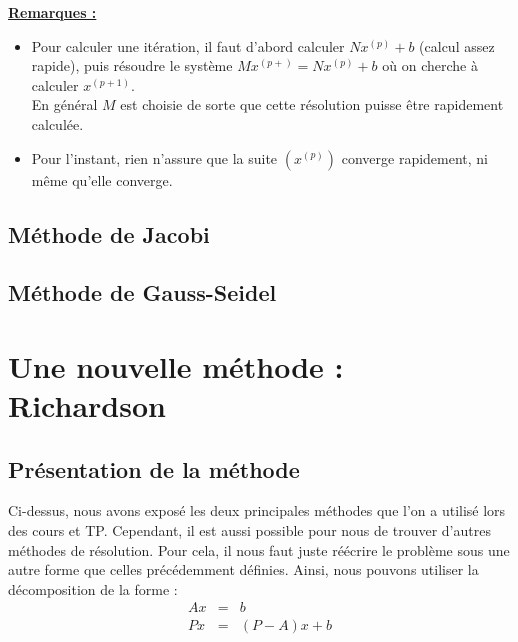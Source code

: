 \noindent \textbf{\underline{Remarques :}}
\begin{itemize}
	\item Pour calculer une itération, il faut d'abord calculer $Nx^{(p)} + b$ (calcul assez rapide), puis résoudre le système $Mx^{(p+)} = Nx^{(p)}+b$ où on cherche à calculer $x^{(p+1)}$.\\
	En général $M$ est choisie de sorte que cette résolution puisse être rapidement calculée.
	\item Pour l'instant, rien n'assure que la suite $\left(x^{(p)}\right)$ converge rapidement, ni même qu'elle converge.
\end{itemize}











\subsection{Méthode de Jacobi}
\subsection{Méthode de Gauss-Seidel}
\section{Une nouvelle méthode : Richardson}
\subsection{Présentation de la méthode}
Ci-dessus, nous avons exposé les deux principales méthodes que l'on a utilisé lors des cours et TP. Cependant, il est aussi possible pour nous de trouver d'autres méthodes de résolution. Pour cela, il nous faut juste réécrire le problème sous une autre forme que celles précédemment définies. Ainsi, nous pouvons utiliser la décomposition de la forme :  
\begin{eqnarray}
Ax &=& b\\
Px &=& (P - A)x + b
\end{eqnarray}


